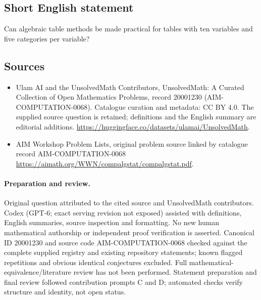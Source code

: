 \documentclass[11pt]{article}
\begin{document}
\subsection{Short English statement}
Can algebraic table methods be made practical for tables with ten variables and five categories per variable?
\subsection{Sources}
\begin{itemize}
\item[\hypertarget{source:20001230:1}{S1}] Ulam AI and the UnsolvedMath Contributors, UnsolvedMath: A Curated Collection of Open Mathematics Problems, record 20001230 (AIM-COMPUTATION-0068). Catalogue curation and metadata: CC BY 4.0. The supplied source question is retained; definitions and the English summary are editorial additions.
\url{https://huggingface.co/datasets/ulamai/UnsolvedMath}.
\item[\hypertarget{source:20001230:2}{S2}] AIM Workshop Problem Lists, original problem source linked by catalogue record AIM-COMPUTATION-0068
\url{https://aimath.org/WWN/compalgstat/compalgstat.pdf}.
\end{itemize}
\paragraph{Preparation and review.}
Original question attributed to the cited source and UnsolvedMath contributors. Codex (GPT-6; exact serving revision not exposed) assisted with definitions, English summaries, source inspection and formatting. No new human mathematical authorship or independent proof verification is asserted. Canonical ID 20001230 and source code AIM-COMPUTATION-0068 checked against the complete supplied registry and existing repository statements; known flagged repetitions and obvious identical conjectures excluded. Full mathematical-equivalence/literature review has not been performed. Statement preparation and final review followed contribution prompts C and D; automated checks verify structure and identity, not open status.
\label{end:20001230}
\end{document}
